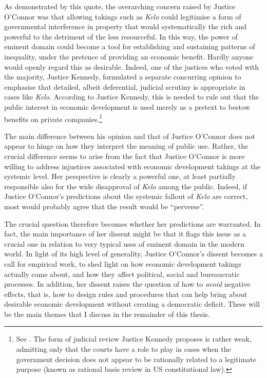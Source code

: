 As demonstrated by this quote, the overarching concern raised by Justice O'Connor was that allowing takings such as {\it Kelo} could legitimise a form of governmental interference in property that would systematically  the rich and powerful to the detriment of the less resourceful. In this way, the power of eminent domain could become a tool for establishing and sustaining patterns of inequality, under the pretence of providing an economic benefit. Hardly anyone would openly regard this as desirable. Indeed, one of the justices who voted with the majority, Justice Kennedy, formulated a separate concurring opinion to emphasise that detailed, albeit deferential, judicial scrutiny is appropriate in cases like {\it Kelo}. According to Justice Kennedy, this is needed to rule out that the public interest in economic development is used merely as a pretext to bestow benefits on private companies.\footnote{See \cite[490-493]{kelo05}. The form of judicial review Justice Kennedy proposes is rather weak, admitting only that the courts have a role to play in cases when the government decision does not appear to be rationally related to a legitimate purpose (known as rational basis review in US constitutional law).}

The main difference between his opinion and that of Justice O'Connor does not appear to hinge on how they interpret the meaning of public use. Rather, the crucial difference seems to arise from the fact that Justice O'Connor is more willing to address injustices associated with economic development takings at the systemic level. Her perspective is clearly a powerful one, at least partially responsible also for the wide disapproval of {\it Kelo} among the public. Indeed, if Justice O'Connor's predictions about the systemic fallout of {\it Kelo} are correct, most would probably agree that the result would be ``perverse''.

The crucial question therefore becomes whether her predictions are warranted. In fact, the main importance of her dissent might be that it flags this issue as a crucial one in relation to very typical uses of eminent domain in the modern world. In light of its high level of generality, Justice O'Connor's dissent becomes a call for empirical work, to shed light on how economic development takings actually come about, and how they affect political, social and bureaucratic processes. In addition, her dissent raises the question of how to {\it avoid} negative effects, that is, how to design rules and procedures that can help bring about desirable economic development without creating a democratic deficit. These will be the main themes that I discuss in the remainder of this thesis.

